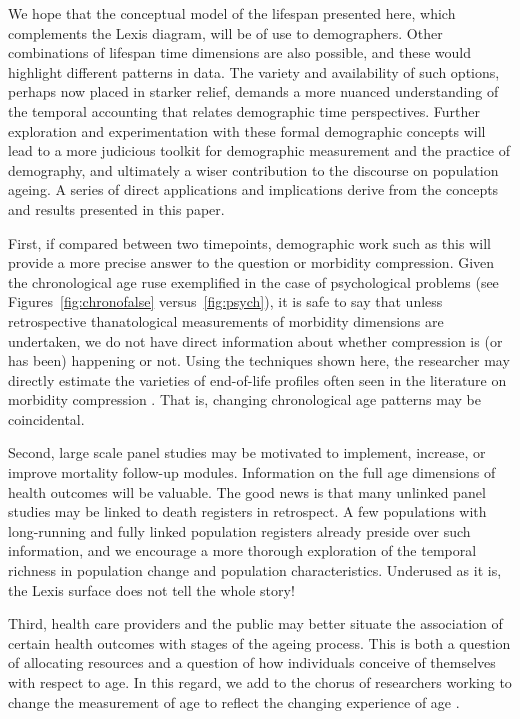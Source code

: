 \documentclass[11pt,oneside]{article} %
\begin{document}
We hope that the conceptual model of the
lifespan presented here, which complements the Lexis diagram, will be of use to
demographers. Other combinations of lifespan time dimensions are also possible,
and these would highlight different patterns in data. The variety and
availability of such options, perhaps now placed in starker relief, demands a more nuanced
understanding of the temporal accounting that relates demographic time
perspectives. Further exploration and experimentation with these formal
demographic concepts will lead to a more judicious toolkit for demographic
measurement and the practice of demography, and ultimately a wiser contribution
to the discourse on population ageing. A series of direct applications and
implications derive from the concepts and results presented in this paper. 

First, if
compared between two timepoints, demographic work such as this will
provide a more precise answer to the question or morbidity compression. Given the chronological age ruse exemplified in the case of psychological problems (see Figures~\ref{fig:chronofalse} versus~\ref{fig:psych}), it is safe to say that unless retrospective
thanatological measurements of morbidity dimensions are undertaken, we do
not have direct information about whether compression is (or has
been) happening or not. Using the techniques shown here, the researcher may
directly estimate the varieties of end-of-life profiles often seen in the
literature on morbidity compression \citep[e.g.,][]{fries2011compression}. That
is, changing chronological age patterns may be coincidental.

Second, large scale panel studies may be motivated to
implement, increase, or improve mortality follow-up modules. Information
on the full age dimensions of health outcomes will be valuable. The good news is
that many unlinked panel studies may be linked to death registers in
retrospect. A few populations with long-running and fully linked
population registers already preside over such information, and we encourage a
more thorough exploration of the temporal richness in population change and
population characteristics. Underused as it is, the Lexis surface does not tell
the whole story! 

Third, health care providers and the public may better situate the association
of certain health outcomes with stages of the ageing process. This is both a
question of allocating resources and a question of how individuals conceive of
themselves with respect to age. In this regard, we add to the chorus of
researchers working to change the measurement of age to reflect the changing
experience of age \citep[see e.g.,][]{sanderson2013characteristics}. 
\end{document}
